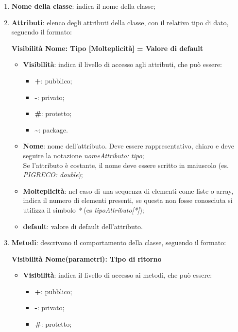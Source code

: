 \begin{enumerate}
	\item \textbf{Nome della classe}: indica il nome della classe;
	\item \textbf{Attributi}: elenco degli attributi della classe, con il relativo tipo di dato, seguendo il formato: \\ \begin{center}\textbf{Visibilità Nome: Tipo [Molteplicità] = Valore di default}\end{center}
	\begin{itemize}
		\item \textbf{Visibilità}: indica il livello di accesso agli attributi, che può essere:
		\begin{itemize}
			\item \textbf{+}: pubblico;
			\item \textbf{-}: privato;
			\item \textbf{\#}: protetto;
			\item \textbf{\textasciitilde}: package.
		\end{itemize}
		\item \textbf{Nome}: nome dell'attributo. Deve essere rappresentativo, chiaro e deve seguire la notazione \textit{nomeAttributo: tipo}; \\ Se l'attributo è costante, il nome deve essere scritto in maiuscolo (es. \textit{PIGRECO: double});
		\item \textbf{Molteplicità}: nel caso di una sequenza di elementi come liste o array, indica il numero di elementi presenti, se questa non fosse conosciuta si utilizza il simbolo \textit{*} (es \textit{tipoAttributo[*]});
		\item \textbf{default}: valore di default dell'attributo.
	\end{itemize}
	\item \textbf{Metodi}: descrivono il comportamento della classe, seguendo il formato: \\ \begin{center}\textbf{Visibilità Nome(parametri): Tipo di ritorno}\end{center}
	\begin{itemize}
		\item \textbf{Visibilità}: indica il livello di accesso ai metodi, che può essere:
		\begin{itemize}
			\item \textbf{+}: pubblico;
			\item \textbf{-}: privato;
			\item \textbf{\#}: protetto;

\end{itemize}
\end{itemize}
\end{enumerate}
